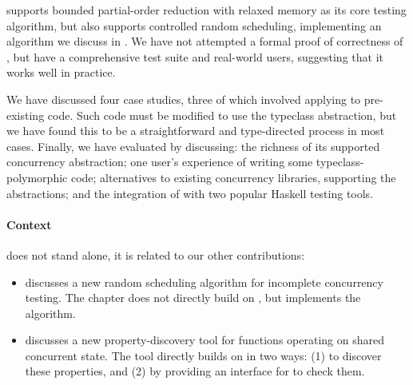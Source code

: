 \dejafu{} supports bounded partial-order reduction\cite{coons2013}
with relaxed memory\cite{zhang2015} as its core testing algorithm, but
also supports controlled random scheduling, implementing an algorithm
we discuss in .  We have not attempted a formal
proof of correctness of \dejafu{}, but have a comprehensive test suite
and real-world users, suggesting that it works well in practice.

We have discussed four case studies, three of which involved applying
\dejafu{} to pre-existing code.  Such code must be modified to use the
\dejafu{} typeclass abstraction, but we have found this to be a
straightforward and type-directed process in most cases.  Finally, we
have evaluated \dejafu{} by discussing: the richness of its supported
concurrency abstraction; one user's experience of writing some
typeclass-polymorphic code; alternatives to existing concurrency
libraries, supporting the \dejafu{} abstractions; and the integration
of \dejafu{} with two popular Haskell testing tools.

\paragraph{Context}
\dejafu{} does not stand alone, it is related to our other
contributions:

\begin{itemize}
\item {} discusses a new random scheduling
  algorithm for incomplete concurrency testing.  The chapter does not
  directly build on \dejafu{}, but \dejafu{} implements the algorithm.
\item {} discusses a new property-discovery tool for
  functions operating on shared concurrent state.  The tool directly
  builds on \dejafu{} in two ways: (1) to discover these properties,
  and (2) by providing an interface for \dejafu{} to check them.
\end{itemize}
